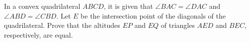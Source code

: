 In a convex quadrilateral $ABCD$, it is given that $\angle BAC=\angle DAC$ and $\angle ABD=\angle CBD$. Let $E$ be the intersection point of the diagonals of the quadrilateral. Prove that the altitudes $EP$ and $EQ$ of triangles $AED$ and $BEC$, respectively, are equal.
